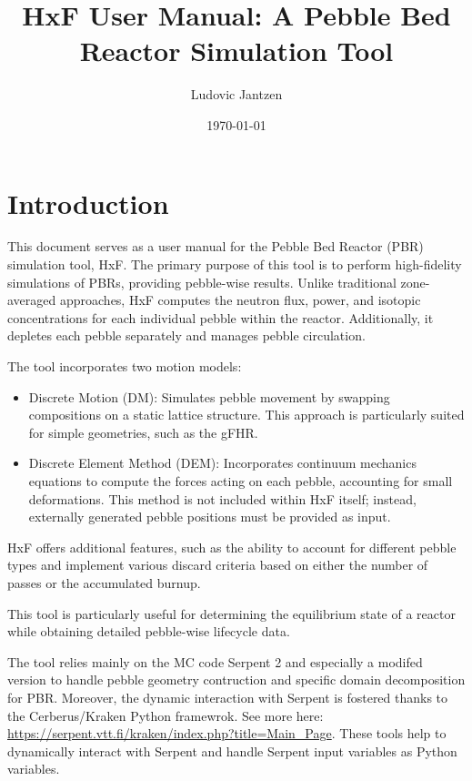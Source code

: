 \documentclass{article}
\title{HxF User Manual: A Pebble Bed Reactor Simulation Tool}
\author{Ludovic Jantzen}
\date{\today}
\begin{document}
\maketitle
\tableofcontents
\newpage
\section{Introduction}
This document serves as a user manual for the Pebble Bed Reactor (PBR) simulation tool, HxF. The primary purpose of this tool is to perform high-fidelity simulations of PBRs, providing pebble-wise results. Unlike traditional zone-averaged approaches, HxF computes the neutron flux, power, and isotopic concentrations for each individual pebble within the reactor. Additionally, it depletes each pebble separately and manages pebble circulation.

The tool incorporates two motion models:
\begin{itemize}
\item Discrete Motion (DM): Simulates pebble movement by swapping compositions on a static lattice structure. This approach is particularly suited for simple geometries, such as the gFHR.
\item Discrete Element Method (DEM): Incorporates continuum mechanics equations to compute the forces acting on each pebble, accounting for small deformations. This method is not included within HxF itself; instead, externally generated pebble positions must be provided as input.
\end{itemize}

HxF offers additional features, such as the ability to account for different pebble types and implement various discard criteria based on either the number of passes or the accumulated burnup.

This tool is particularly useful for determining the equilibrium state of a reactor while obtaining detailed pebble-wise lifecycle data.

The tool relies mainly on the MC code Serpent 2 \cite{Serpent} and especially a modifed version to handle pebble geometry contruction and specific domain decomposition for PBR. Moreover, the dynamic interaction with Serpent is fostered thanks to the Cerberus/Kraken Python framewrok. See more here: \url{https://serpent.vtt.fi/kraken/index.php?title=Main_Page}. These tools help to dynamically interact with Serpent and handle Serpent input variables as Python variables.
\newpage
\end{document}
